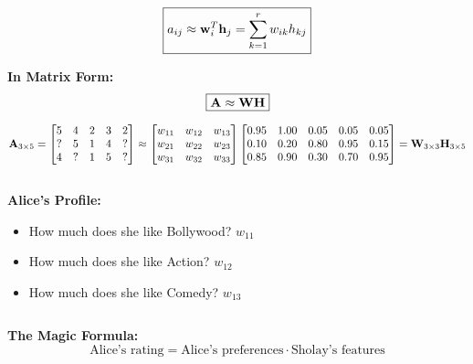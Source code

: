 \documentclass{beamer}
\begin{document}
\begin{frame}\begin{equation*}
\boxed{a_{ij} \approx \mathbf{w}_i^T \mathbf{h}_j = \sum_{k=1}^r w_{ik} h_{kj}}
\end{equation*}

\pause
\textbf{In Matrix Form:}
\begin{equation*}
\boxed{\mathbf{A} \approx \mathbf{W} \mathbf{H}}
\end{equation*}

\pause
\begin{center}
$\mathbf{A}_{3 \times 5} =
\begin{bmatrix}
5 & 4 & 2 & 3 & 2 \\
? & 5 & 1 & 4 & ? \\
4 & ? & 1 & 5 & ? 
\end{bmatrix}
\approx
\begin{bmatrix}
w_{11} & w_{12} & w_{13} \\
w_{21} & w_{22} & w_{23} \\
w_{31} & w_{32} & w_{33}
\end{bmatrix}
\begin{bmatrix}
0.95 & 1.00 & 0.05 & 0.05 & 0.05 \\
0.10 & 0.20 & 0.80 & 0.95 & 0.15 \\
0.85 & 0.90 & 0.30 & 0.70 & 0.95
\end{bmatrix}
= \mathbf{W}_{3 \times 3} \mathbf{H}_{3 \times 5}$
\end{center}
\end{frame}

\begin{frame}\begin{columns}[T]
\begin{column}{0.5\textwidth}
\textbf{Alice's Profile:}
\begin{itemize}
\item How much does she like Bollywood? $w_{11}$
    \item How much does she like Action? $w_{12}$
    \pause
\item How much does she like Comedy? $w_{13}$
\end{itemize}
\end{column}
\begin{column}{0.5\textwidth}
\end{column}
\end{columns}

\pause
\vspace{0.5cm}
\textbf{The Magic Formula:} 
$$\text{Alice's rating} = \text{Alice's preferences} \cdot \text{Sholay's features}$$
\end{frame}
\end{document}
